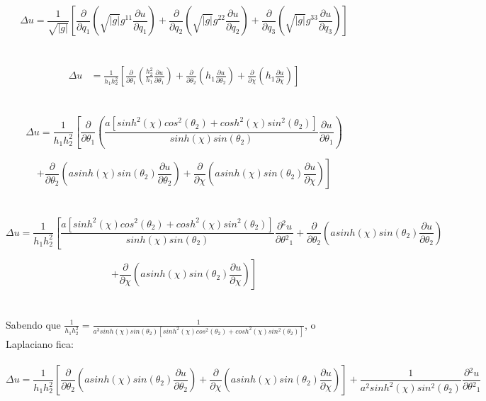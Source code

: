 \documentclass[12pt, a4papper]{article}
\begin{document}
\[
\Delta u=\frac{1}{\sqrt{\left\vert g\right\vert }}\left[\frac{\partial}{\partial q_{1}}\left(\sqrt{\left\vert g\right\vert }g^{11}\frac{\partial u}{\partial q_{1}}\right)+\frac{\partial}{\partial q_{2}}\left(\sqrt{\left\vert g\right\vert }g^{22}\frac{\partial u}{\partial q_{2}}\right)+\frac{\partial}{\partial q_{3}}\left(\sqrt{\left\vert g\right\vert }g^{33}\frac{\partial u}{\partial q_{3}}\right)\right]
\]
\\
\\
\begin{align*}
\Delta u & =\frac{1}{h_{1}h_{2}^{2}}\left[\frac{\partial}{\partial\theta_{1}}\left(\frac{h_{2}^{2}}{h_{1}}\frac{\partial u}{\partial\theta_{1}}\right)+\frac{\partial}{\partial\theta_{2}}\left(h_{1}\frac{\partial u}{\partial\theta_{2}}\right)+\frac{\partial}{\partial\chi}\left(h_{1}\frac{\partial u}{\partial\chi}\right)\right]
\end{align*}
\\
\\
\[
\Delta u=\frac{1}{h_{1}h_{2}^{2}}\left[\frac{\partial}{\partial\theta_{1}}\left(\frac{a\left[sinh^{2}(\chi)cos^{2}(\theta_{2})+cosh^{2}(\chi)sin^{2}(\theta_{2})\right]}{sinh(\chi)sin(\theta_{2})}\frac{\partial u}{\partial\theta_{1}}\right) \right.
\]

\[ 
\left. +\frac{\partial}{\partial\theta_{2}}\left(asinh(\chi)sin(\theta_{2})\frac{\partial u}{\partial\theta_{2}}\right)+\frac{\partial}{\partial\chi}\left(asinh(\chi)sin(\theta_{2})\frac{\partial u}{\partial\chi}\right)\right]
\]
\\
\\
\[
\Delta u=\frac{1}{h_{1}h_{2}^{2}}\left[\frac{a\left[sinh^{2}(\chi)cos^{2}(\theta_{2})+cosh^{2}(\chi)sin^{2}(\theta_{2})\right]}{sinh(\chi)sin(\theta_{2})}\frac{\partial{{}^2}u}{\partial\theta{{}^2}_{1}}+\frac{\partial}{\partial\theta_{2}}\left(asinh(\chi)sin(\theta_{2})\frac{\partial u}{\partial\theta_{2}}\right) \right.
\]

\[ \left. +\frac{\partial}{\partial\chi}\left(asinh(\chi)sin(\theta_{2})\frac{\partial u}{\partial\chi}\right)\right] \]
\\
\\
Sabendo que $\frac{1}{h_{1}h_{2}^{2}}=\frac{1}{a^{3}sinh(\chi)sin(\theta_{2})\left[sinh^{2}(\chi)cos^{2}(\theta_{2})+cosh^{2}(\chi)sin^{2}(\theta_{2})\right]}$,
o Laplaciano fica:
\\
\\
\[
\Delta u=\frac{1}{h_{1}h_{2}^{2}}\left[\frac{\partial}{\partial\theta_{2}}\left(asinh(\chi)sin(\theta_{2})\frac{\partial u}{\partial\theta_{2}}\right)+\frac{\partial}{\partial\chi}\left(asinh(\chi)sin(\theta_{2})\frac{\partial u}{\partial\chi}\right)\right]+\frac{1}{a^{2}sinh^{2}(\chi)sin^{2}(\theta_{2})}\frac{\partial{{}^2}u}{\partial\theta{{}^2}_{1}}
\]
\end{document}
